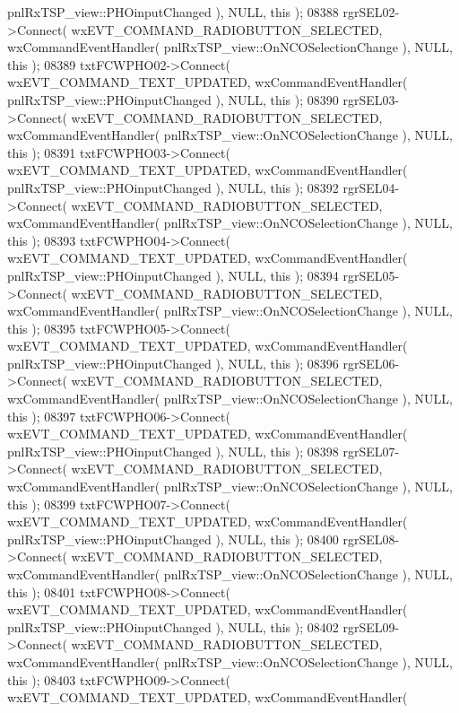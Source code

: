 \begin{DoxyCode}
      pnlRxTSP_view::PHOinputChanged ), NULL, \textcolor{keyword}{this} );
08388     rgrSEL02->Connect( wxEVT\_COMMAND\_RADIOBUTTON\_SELECTED, wxCommandEventHandler( 
      pnlRxTSP_view::OnNCOSelectionChange ), NULL, \textcolor{keyword}{this} );
08389     txtFCWPHO02->Connect( wxEVT\_COMMAND\_TEXT\_UPDATED, wxCommandEventHandler( 
      pnlRxTSP_view::PHOinputChanged ), NULL, \textcolor{keyword}{this} );
08390     rgrSEL03->Connect( wxEVT\_COMMAND\_RADIOBUTTON\_SELECTED, wxCommandEventHandler( 
      pnlRxTSP_view::OnNCOSelectionChange ), NULL, \textcolor{keyword}{this} );
08391     txtFCWPHO03->Connect( wxEVT\_COMMAND\_TEXT\_UPDATED, wxCommandEventHandler( 
      pnlRxTSP_view::PHOinputChanged ), NULL, \textcolor{keyword}{this} );
08392     rgrSEL04->Connect( wxEVT\_COMMAND\_RADIOBUTTON\_SELECTED, wxCommandEventHandler( 
      pnlRxTSP_view::OnNCOSelectionChange ), NULL, \textcolor{keyword}{this} );
08393     txtFCWPHO04->Connect( wxEVT\_COMMAND\_TEXT\_UPDATED, wxCommandEventHandler( 
      pnlRxTSP_view::PHOinputChanged ), NULL, \textcolor{keyword}{this} );
08394     rgrSEL05->Connect( wxEVT\_COMMAND\_RADIOBUTTON\_SELECTED, wxCommandEventHandler( 
      pnlRxTSP_view::OnNCOSelectionChange ), NULL, \textcolor{keyword}{this} );
08395     txtFCWPHO05->Connect( wxEVT\_COMMAND\_TEXT\_UPDATED, wxCommandEventHandler( 
      pnlRxTSP_view::PHOinputChanged ), NULL, \textcolor{keyword}{this} );
08396     rgrSEL06->Connect( wxEVT\_COMMAND\_RADIOBUTTON\_SELECTED, wxCommandEventHandler( 
      pnlRxTSP_view::OnNCOSelectionChange ), NULL, \textcolor{keyword}{this} );
08397     txtFCWPHO06->Connect( wxEVT\_COMMAND\_TEXT\_UPDATED, wxCommandEventHandler( 
      pnlRxTSP_view::PHOinputChanged ), NULL, \textcolor{keyword}{this} );
08398     rgrSEL07->Connect( wxEVT\_COMMAND\_RADIOBUTTON\_SELECTED, wxCommandEventHandler( 
      pnlRxTSP_view::OnNCOSelectionChange ), NULL, \textcolor{keyword}{this} );
08399     txtFCWPHO07->Connect( wxEVT\_COMMAND\_TEXT\_UPDATED, wxCommandEventHandler( 
      pnlRxTSP_view::PHOinputChanged ), NULL, \textcolor{keyword}{this} );
08400     rgrSEL08->Connect( wxEVT\_COMMAND\_RADIOBUTTON\_SELECTED, wxCommandEventHandler( 
      pnlRxTSP_view::OnNCOSelectionChange ), NULL, \textcolor{keyword}{this} );
08401     txtFCWPHO08->Connect( wxEVT\_COMMAND\_TEXT\_UPDATED, wxCommandEventHandler( 
      pnlRxTSP_view::PHOinputChanged ), NULL, \textcolor{keyword}{this} );
08402     rgrSEL09->Connect( wxEVT\_COMMAND\_RADIOBUTTON\_SELECTED, wxCommandEventHandler( 
      pnlRxTSP_view::OnNCOSelectionChange ), NULL, \textcolor{keyword}{this} );
08403     txtFCWPHO09->Connect( wxEVT\_COMMAND\_TEXT\_UPDATED, wxCommandEventHandler( 

\end{DoxyCode}
